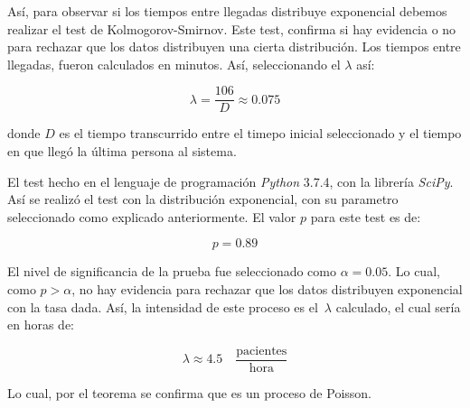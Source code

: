 \documentclass[11pt]{article}
\theoremstyle{definition}
\theoremstyle{remark}
\theoremstyle{remark}
\theoremstyle{theorem}
\begin{document}
Así, para observar si los tiempos entre llegadas distribuye
exponencial debemos realizar el test de Kolmogorov-Smirnov. Este test,
confirma si hay evidencia o no para rechazar que los datos distribuyen
una cierta distribución. Los tiempos entre llegadas, fueron calculados en minutos. Así, seleccionando el $\lambda$ así:

\begin{equation*}
  \lambda = \frac{106}{D} \approx 0.075
\end{equation*}

donde $D$ es el tiempo transcurrido entre el timepo inicial
seleccionado y el tiempo en que llegó la última persona al sistema.

El test hecho en el lenguaje de programación \textit{Python} 3.7.4,
con la librería \textit{SciPy}. Así se realizó el test con la
distribución exponencial, con su parametro seleccionado como explicado
anteriormente. El valor $p$ para este test es de:

\begin{equation*}
  p = 0.89
\end{equation*}

El nivel de significancia de la prueba fue seleccionado como
$\alpha = 0.05$. Lo cual, como $p > \alpha$, no hay evidencia para
rechazar que los datos distribuyen exponencial con la tasa dada. Así,
la intensidad de este proceso es el~$\lambda$ calculado, el cual sería
en horas de:

\begin{equation}
  \lambda \approx 4.5 \quad \frac{\text{pacientes}}{\text{hora}}
\end{equation}

Lo cual, por el teorema se confirma que es un proceso de Poisson.
\end{document}
